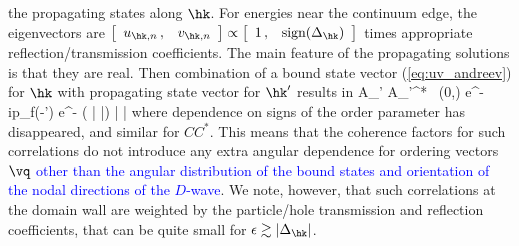 \documentclass[prb,aps,showpacs,amsmath,twocolumn,10pt]{revtex4-1}
\newcommand{\blue}{\textcolor{blue}}
\newcommand{\sign}{\mbox{sign}}
\begin{document}
the propagating states along $\hk$. For energies near the continuum edge, the eigenvectors are 
$
\left[ \begin{array}{cc} u_{\hk,n} \,,& v_{\hk,n} \end{array} \right] 
\propto 
\left[ \begin{array}{cc} 1 \,,& \sign(\Delta_{\hk})  \end{array} \right]
$
times appropriate reflection/transmission coefficients. 
The main feature of the propagating solutions is that they are real. 
Then combination of a bound state vector (\ref{eq:uv_andreev}) for $\hk$ with 
propagating state vector for $\hk'$ results in 
\be
\label{eq:AA_bf}
A_{\hk\hk'} A_{\hk\hk'}^* \, (0,\vr) \propto 
e^{-ip_f(\hk-\hk')\cdot\vr}  \; 
e^{-  \left( \left|  \right|\right) | \vr\hx|}
\ee
where dependence on signs of the order parameter has disappeared, 
and similar for $CC^*$. 
This means that the coherence factors for such correlations do not 
introduce any extra angular dependence for ordering vectors $\vq$ \blue{other than the angular distribution of the bound states and orientation of the nodal directions of the $D$-wave}.  
We note, however, that such correlations at the domain wall are weighted by the 
particle/hole transmission and reflection coefficients,  
that can be quite small for $\epsilon \gtrsim |\Delta_{\hk}|$. 
\end{document}

